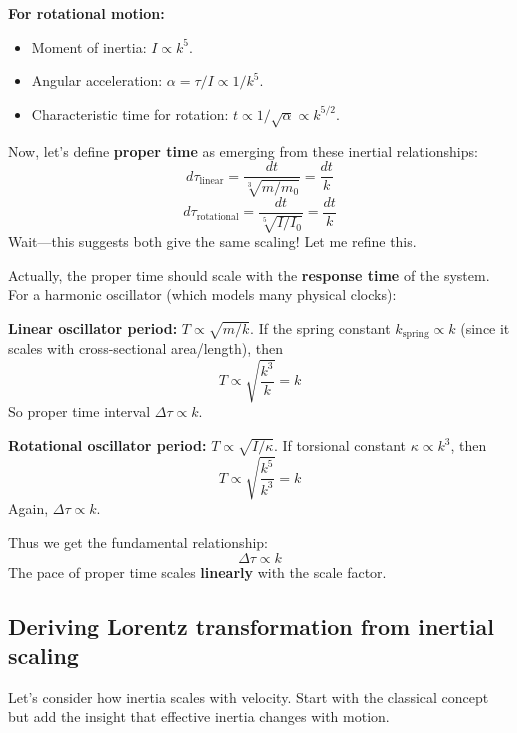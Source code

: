 \textbf{For rotational motion:}
\begin{itemize}[leftmargin=0.5cm]
    \item Moment of inertia: $I \propto k^5$.
    \item Angular acceleration: $\alpha = \tau/I \propto 1/k^5$.
    \item Characteristic time for rotation: $t \propto 1/\sqrt{\alpha} \propto k^{5/2}$.
\end{itemize}

Now, let's define \textbf{proper time} as emerging from these inertial relationships:
\[
 d\tau_{\text{linear}} = \frac{dt}{\sqrt[3]{m/m_0}} = \frac{dt}{k}
\]
\[
 d\tau_{\text{rotational}} = \frac{dt}{\sqrt[5]{I/I_0}} = \frac{dt}{k}
\]
Wait---this suggests both give the same scaling! Let me refine this.

Actually, the proper time should scale with the \textbf{response time} of the system. For a harmonic oscillator (which models many physical clocks):

\textbf{Linear oscillator period:} $T \propto \sqrt{m/k}$.
If the spring constant $k_{\text{spring}} \propto k$ (since it scales with cross-sectional area/length), then
\[
 T \propto \sqrt{\frac{k^3}{k}} = k
\]
So proper time interval $\Delta\tau \propto k$.

\textbf{Rotational oscillator period:} $T \propto \sqrt{I/\kappa}$.
If torsional constant $\kappa \propto k^3$, then
\[
 T \propto \sqrt{\frac{k^5}{k^3}} = k
\]
Again, $\Delta\tau \propto k$.

Thus we get the fundamental relationship:
\[
\boxed{\Delta\tau \propto k}
\]
The pace of proper time scales \textbf{linearly} with the scale factor.

\subsection{Deriving Lorentz transformation from inertial scaling}
Let's consider how inertia scales with velocity. Start with the classical concept but add the insight that effective inertia changes with motion.

